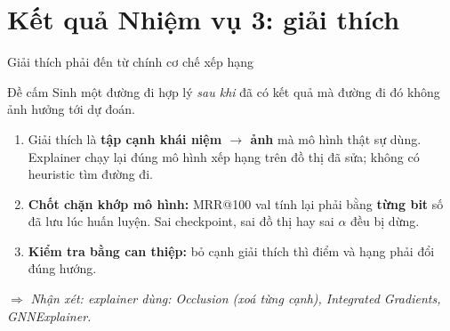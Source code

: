 \documentclass[10pt, aspectratio=169]{beamer}
\makeatletter
\newcommand{\nhanxet}[1]{\par\smallskip$\Rightarrow$ \textit{Nhận xét: #1}}
\newcommand{\mrr}{MRR@100}
\makeatother
\begin{document}
\section{Kết quả Nhiệm vụ 3: giải thích}

\begin{frame}{Giải thích phải đến từ chính cơ chế xếp hạng}
  \begin{alertblock}{Đề cấm}
    Sinh một đường đi hợp lý \textit{sau khi} đã có kết quả mà đường đi đó không ảnh hưởng tới dự đoán.
  \end{alertblock}
  \begin{enumerate}
    \item Giải thích là \textbf{tập cạnh khái niệm $\to$ ảnh} mà mô hình thật sự dùng. Explainer chạy lại đúng mô hình xếp hạng trên đồ thị đã sửa; không có heuristic tìm đường đi.
    \item \textbf{Chốt chặn khớp mô hình:} \mrr{} val tính lại phải bằng \textbf{từng bit} số đã lưu lúc huấn luyện. Sai checkpoint, sai đồ thị hay sai $\alpha$ đều bị dừng.
    \item \textbf{Kiểm tra bằng can thiệp:} bỏ cạnh giải thích thì điểm và hạng phải đổi đúng hướng.
  \end{enumerate}
  \nhanxet{explainer dùng: Occlusion (xoá từng cạnh), Integrated Gradients, GNNExplainer.}
\end{frame}
\end{document}
